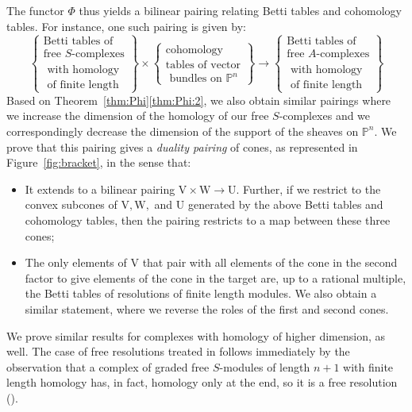 \documentclass[12pt]{amsart}
\theoremstyle{definition}
\theoremstyle{remark}
\newcommand{\PP}{\mathbb{P}}
\newcommand{\UU}{\mathrm{U}}
\newcommand{\VV}{\mathrm{V}}
\newcommand{\WW}{\mathrm{W}}
\begin{document}
The functor $\Phi$ thus yields a bilinear pairing relating Betti tables and cohomology tables.  For instance, one such pairing is given by:
\begin{equation*}%
\label{eqn:**}
%
\left\{\begin{matrix}
\text{Betti tables of} \\ \text{free $S$-complexes}\\
\text{ with homology}\\ \text{ of finite length}
\end{matrix}\right\}
%
\times 
%
\left\{\begin{matrix}
\text{cohomology }\\
\text{tables of vector}\\
\text{ bundles on } \PP^n
\end{matrix}\right\}
%
\longrightarrow
\left\{\begin{matrix}
\text{Betti tables of} \\ \text{free $A$-complexes}\\
\text{ with homology}\\ \text{ of finite length}
\end{matrix}\right\}
\end{equation*}
Based on Theorem~\ref{thm:Phi}\eqref{thm:Phi:2}, we also obtain similar pairings where we increase the dimension of the homology of our free $S$-complexes and we correspondingly decrease the dimension of the support of the sheaves on $\mathbb P^n$.  We prove that this pairing gives a  \emph{duality pairing} of cones, as represented in Figure~\ref{fig:bracket},
in the sense that: 
\begin{itemize}
\item It extends to a bilinear pairing $\VV\times \WW\to \UU$.  Further, if we restrict to the convex subcones of $\VV, \WW,$ and $\UU$ generated by the above Betti tables and cohomology tables, then the pairing restricts to a map between these three cones;
\item The only elements of $\VV$ that pair with all elements of the cone in the second factor
 to give elements of the cone in the target are, up to a rational multiple, the Betti tables of  resolutions of finite length modules.  We also obtain a similar statement, where we reverse the roles of 
 the first and second cones.
\end{itemize} 
 We prove similar results for complexes with homology of higher dimension, as well. The case of free resolutions treated in \cite{eis-schrey1} follows immediately by the observation that a  complex of graded free $S$-modules of length $n+1$ with finite length homology has, in fact, homology only at the end, so it is a free resolution (\cite{}).
\end{document}
